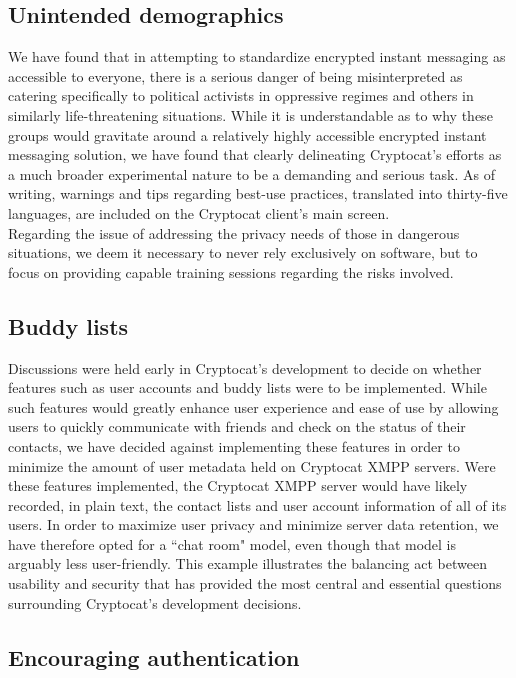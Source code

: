 \documentclass[letterpaper,twocolumn,10pt]{article}
\begin{document}
\subsection{Unintended demographics}

We have found that in attempting to standardize encrypted instant messaging as accessible to everyone, there is a serious danger of being misinterpreted as catering specifically to political activists in oppressive regimes and others in similarly life-threatening situations. While it is understandable as to why these groups would gravitate around a relatively highly accessible encrypted instant messaging solution, we have found that clearly delineating Cryptocat's efforts as a much broader experimental nature to be a demanding and serious task. As of writing, warnings and tips regarding best-use practices, translated into thirty-five languages, are included on the Cryptocat client's main screen. \\
Regarding the issue of addressing the privacy needs of those in dangerous situations, we deem it necessary to never rely exclusively on software, but to focus on providing capable training sessions regarding the risks involved.

\subsection{Buddy lists}

Discussions were held early in Cryptocat's development to decide on whether features such as user accounts and buddy lists were to be implemented. While such features would greatly enhance user experience and ease of use by allowing users to quickly communicate with friends and check on the status of their contacts, we have decided against implementing these features in order to minimize the amount of user metadata held on Cryptocat XMPP servers. Were these features implemented, the Cryptocat XMPP server would have likely recorded, in plain text, the contact lists and user account information of all of its users. In order to maximize user privacy and minimize server data retention, we have therefore opted for a ``chat room" model, even though that model is arguably less user-friendly. This example illustrates the balancing act between usability and security that has provided the most central and essential questions surrounding Cryptocat's development decisions.

\subsection{Encouraging authentication}
\end{document}
